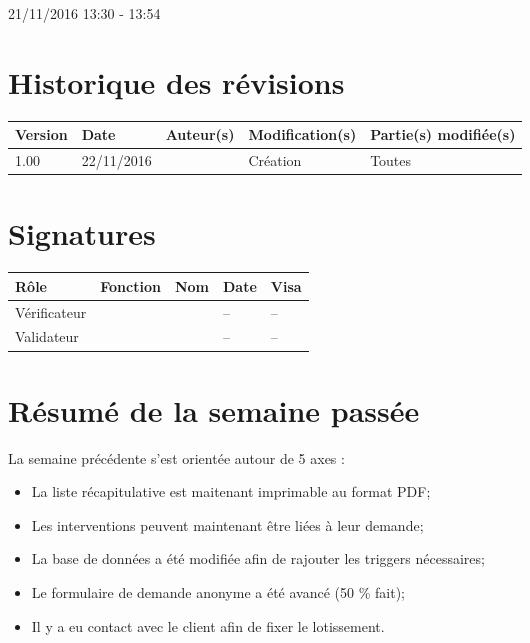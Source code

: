 \documentclass [a4paper] {article}
\begin{document}
21/11/2016			 				%
\hfill   
\hfill 	 13:30 - 13:54				%


\section*{Historique des révisions}
\begin{center}
			\begin{tabular}{| p{2.5cm} | p{3cm} | p{3cm} | p{3cm} | p{3.5cm} |}
				\hline
				\rowcolor{Gray}
				Version & Date & Auteur(s) & Modification(s) & Partie(s) modifiée(s)		 \\
				\hline
				1.00 & 22/11/2016 & \Kafui & Création & Toutes \\
				\hline			
			\end{tabular}
		\end{center}

\section*{Signatures}

		\begin{center}
			\begin{tabular}{| p{2.5cm} | p{4cm} | p{3cm} | p{3cm} | p{2.5cm} |}
				\hline
				\rowcolor{Gray}
				Rôle & Fonction & Nom & Date & Visa		 \\
				\hline
				Vérificateur & \RGC & \Melissa & -- & -- \\[30pt]
				\hline
				Validateur & \CP & \Pierre &  -- & -- \\[30pt]	
				\hline
			\end{tabular}
		\end{center}

\section{Résumé de la semaine passée}
La semaine précédente s'est orientée autour de 5 axes :  
\begin{itemize}
	\item La liste récapitulative est maitenant imprimable au format PDF;
	\item Les interventions peuvent maintenant être liées à leur demande;
	\item La base de données a été modifiée afin de rajouter les triggers nécessaires;
	\item Le formulaire de demande anonyme a été avancé (50 \% fait);
	\item Il y a eu contact avec le client afin de fixer le lotissement.
\end{itemize} 
\end{document}
